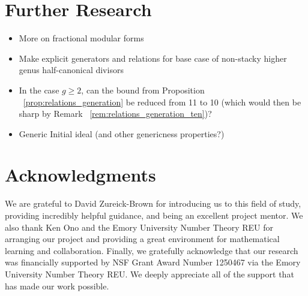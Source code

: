 \documentclass{amsart}
\theoremstyle{plain}
\theoremstyle{definition}
\theoremstyle{remark}
\numberwithin{equation}{section}
\begin{document}
\section{Further Research}
\label{sec:further-questions}
\begin{itemize}
	\item More on fractional modular forms
	\item Make explicit generators and relations for base case of non-stacky higher genus half-canonical divisors
	\item In the case $g \geq 2$, can the bound from Proposition ~\ref{prop:relations_generation} be reduced from 11 to 10 (which would then be sharp by Remark ~\ref{rem:relations_generation_ten})?  
	\item Generic Initial ideal (and other genericness properties?)
\end{itemize}


\section{Acknowledgments}
We are grateful to David Zureick-Brown for introducing us to this
field of study, providing incredibly helpful guidance, and being an
excellent project mentor. We also thank Ken Ono and the Emory University
Number Theory REU for arranging our project and providing a great
environment for mathematical learning and collaboration. Finally, we
gratefully acknowledge that our research was financially supported by
NSF Grant Award Number 1250467 via the Emory University Number Theory REU.
We deeply appreciate all of the support that has made our work possible.


\nocite{*}
{}

\end{document}

